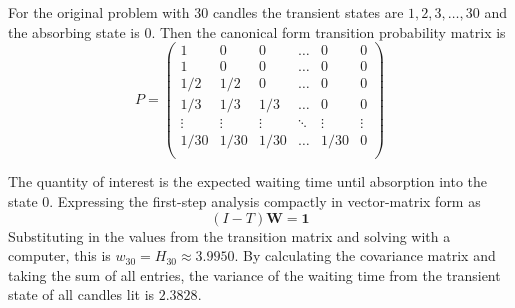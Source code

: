 \documentclass[12pt]{article}
\begin{document}
\begin{example}
    For the original problem with \( 30 \) candles the transient states
    are \( 1, 2, 3, \dots, 30 \) and the absorbing state is \( 0 \).
    Then the canonical form transition probability matrix is
    \[
        P =
        \begin{pmatrix}
            1 & 0 & 0 & \ldots & 0 & 0 \\            
            1 & 0 & 0 & \ldots & 0 & 0 \\
            1/2 & 1/2 & 0 & \ldots & 0 & 0 \\
            1/3 & 1/3 & 1/3 & \ldots & 0 & 0 \\
            \vdots & \vdots & \vdots & \ddots & \vdots & \vdots \\
            1/30 & 1/30 & 1/30 & \ldots & 1/30 & 0 \\
        \end{pmatrix}
    \]

    The quantity of interest is the expected waiting time until
    absorption into the state \( 0 \).  Expressing the first-step
    analysis compactly in vector-matrix form as
    \[
        (I - T) \mathbf{W} = \mathbf{1}
    \] Substituting in the values from the transition matrix and solving
    with a computer, this is \( w_{30} = H_{30} \approx 3.9950 \).
    By calculating the covariance matrix and taking the sum of all
    entries,  the variance of the waiting time from the
    transient state of all candles lit is \( 2.3828 \).
\end{example}
\end{document}
